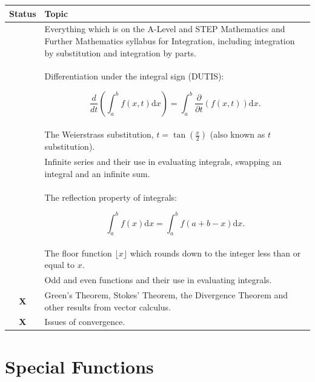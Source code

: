 \documentclass[11pt]{scrartcl}
\providecommand{\isRq}{{\color{green!60!black}\CheckmarkBold}}
\providecommand{\isUs}{{\color{cyan}\sffamily\bfseries O}}
\providecommand{\isAv}{{\color{gray}\sffamily\bfseries !!}}
\providecommand{\isEx}{{\color{red}\sffamily\bfseries X}}
\begin{document}
\begin{center}
	\begin{tabular}{cp{12cm}}
	\toprule Status & Topic \\ \midrule
	\isRq & Everything which is on the A-Level and STEP Mathematics and Further Mathematics syllabus for Integration, including integration by substitution and integration by parts. \\
	\isRq & Differentiation under the integral sign (DUTIS): 
	
	$$\frac{d}{d t}\left(\int_{a}^{b} f(x, t) \mathrm{d} x\right)=\int_{a}^{b} \frac{\partial}{\partial t}(f(x, t)) \mathrm{d} x.$$ \\
	\isRq & The Weierstrass substitution, $t=\tan \left(\frac{x}{2}\right)$ (also known as $t$ substitution). \\
	\isRq & Infinite series and their use in evaluating integrals, swapping an integral and an infinite sum. \\
	\isRq & The reflection property of integrals:

	$$
	\int_{a}^{b} f(x) \mathrm{d} x=\int_{a}^{b} f(a+b-x) \mathrm{d} x.
	$$ \\
	\isRq & The floor function $\lfloor x\rfloor$ which rounds down to the integer less than or equal to $x$. \\
	\isRq & Odd and even functions and their use in evaluating integrals.\\
	\isEx & Green's Theorem, Stokes' Theorem, the Divergence Theorem and other results from vector calculus.\\
	\isEx & Issues of convergence.\\
	\bottomrule
	\end{tabular}
\end{center}

\clearpage

\section{Special Functions}
\end{document}
